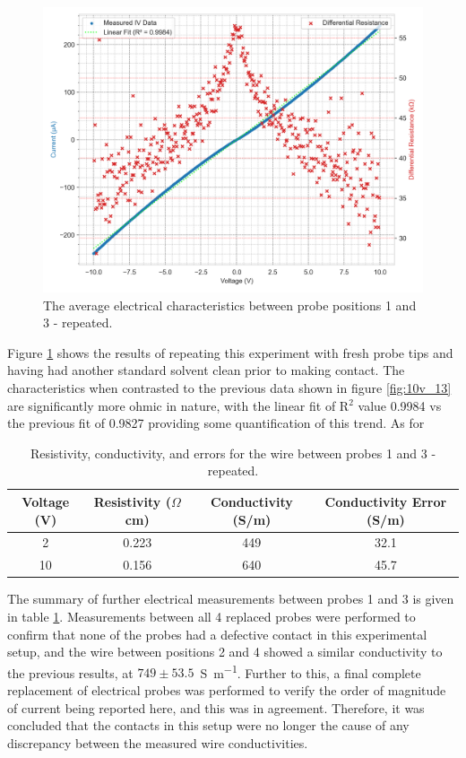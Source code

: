\begin{refsection}
\begin{figure}[H]
    \centering
    \includegraphics[width=\linewidth]{Chapter7/Figs/Raster/10V 13 replaced d.png}
    \caption{The average electrical characteristics between probe positions 1 and 3 - repeated.}
    \label{fig:10v_13_replaced}
\end{figure}

Figure \ref{fig:10v_13_replaced} shows the results of repeating this experiment with fresh probe tips and having had another standard solvent clean prior to making contact. The characteristics when contrasted to the previous data shown in figure \ref{fig:10v_13} are significantly more ohmic in nature, with the linear fit of R$^{2}$ value 0.9984 vs the previous fit of 0.9827 providing some quantification of this trend. As for 

\begin{table}[ht]
\centering
\begin{tabular}{|c|c|c|c|}
\hline
Voltage (V) & Resistivity ($\Omega$cm) & Conductivity (S/m) & Conductivity Error (S/m) \\
\hline
2 & 0.223 & 449 & 32.1 \\
10 & 0.156 & 640 & 45.7 \\
\hline
\end{tabular}
\caption{Resistivity, conductivity, and errors for the wire between probes 1 and 3 - repeated.}
\label{table:13_resistivity_conductivity_replaced}
\end{table}

The summary of further electrical measurements between probes 1 and 3 is given in table \ref{table:13_resistivity_conductivity_replaced}. Measurements between all 4 replaced probes were performed to confirm that none of the probes had a defective contact in this experimental setup, and the wire between positions 2 and 4 showed a similar conductivity to the previous results, at $749\pm53.5$~\si{\siemens\per\metre}. Further to this, a final complete replacement of electrical probes was performed to verify the order of magnitude of current being reported here, and this was in agreement. Therefore, it was concluded that the contacts in this setup were no longer the cause of any discrepancy between the measured wire conductivities. 


\end{refsection}
